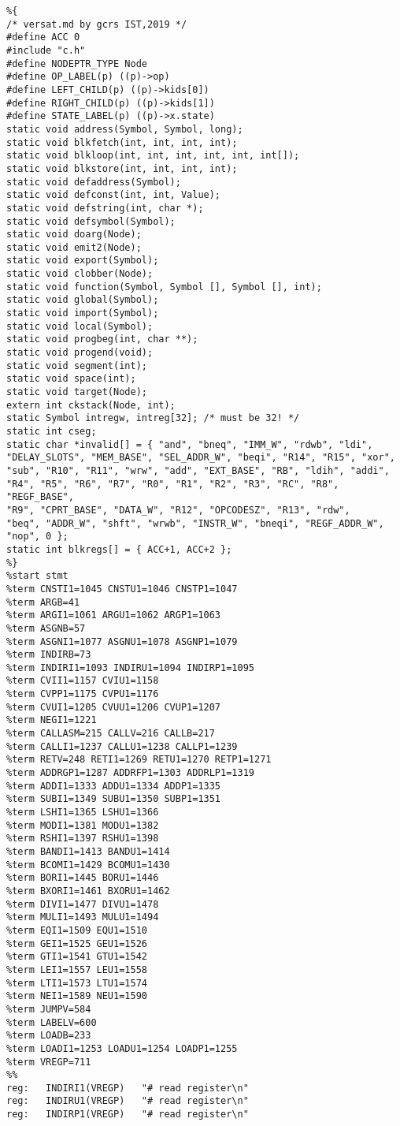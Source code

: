 {\footnotesize
\begin{verbatim}
%{
/* versat.md by gcrs IST,2019 */
#define ACC 0
#include "c.h"
#define NODEPTR_TYPE Node
#define OP_LABEL(p) ((p)->op)
#define LEFT_CHILD(p) ((p)->kids[0])
#define RIGHT_CHILD(p) ((p)->kids[1])
#define STATE_LABEL(p) ((p)->x.state)
static void address(Symbol, Symbol, long);
static void blkfetch(int, int, int, int);
static void blkloop(int, int, int, int, int, int[]);
static void blkstore(int, int, int, int);
static void defaddress(Symbol);
static void defconst(int, int, Value);
static void defstring(int, char *);
static void defsymbol(Symbol);
static void doarg(Node);
static void emit2(Node);
static void export(Symbol);
static void clobber(Node);
static void function(Symbol, Symbol [], Symbol [], int);
static void global(Symbol);
static void import(Symbol);
static void local(Symbol);
static void progbeg(int, char **);
static void progend(void);
static void segment(int);
static void space(int);
static void target(Node);
extern int ckstack(Node, int);
static Symbol intregw, intreg[32]; /* must be 32! */
static int cseg;
static char *invalid[] = { "and", "bneq", "IMM_W", "rdwb", "ldi",
"DELAY_SLOTS", "MEM_BASE", "SEL_ADDR_W", "beqi", "R14", "R15", "xor",
"sub", "R10", "R11", "wrw", "add", "EXT_BASE", "RB", "ldih", "addi",
"R4", "R5", "R6", "R7", "R0", "R1", "R2", "R3", "RC", "R8", "REGF_BASE",
"R9", "CPRT_BASE", "DATA_W", "R12", "OPCODESZ", "R13", "rdw",
"beq", "ADDR_W", "shft", "wrwb", "INSTR_W", "bneqi", "REGF_ADDR_W",
"nop", 0 };
static int blkregs[] = { ACC+1, ACC+2 };
%}
%start stmt
%term CNSTI1=1045 CNSTU1=1046 CNSTP1=1047
%term ARGB=41
%term ARGI1=1061 ARGU1=1062 ARGP1=1063
%term ASGNB=57
%term ASGNI1=1077 ASGNU1=1078 ASGNP1=1079
%term INDIRB=73
%term INDIRI1=1093 INDIRU1=1094 INDIRP1=1095
%term CVII1=1157 CVIU1=1158
%term CVPP1=1175 CVPU1=1176
%term CVUI1=1205 CVUU1=1206 CVUP1=1207
%term NEGI1=1221
%term CALLASM=215 CALLV=216 CALLB=217
%term CALLI1=1237 CALLU1=1238 CALLP1=1239
%term RETV=248 RETI1=1269 RETU1=1270 RETP1=1271
%term ADDRGP1=1287 ADDRFP1=1303 ADDRLP1=1319
%term ADDI1=1333 ADDU1=1334 ADDP1=1335
%term SUBI1=1349 SUBU1=1350 SUBP1=1351
%term LSHI1=1365 LSHU1=1366
%term MODI1=1381 MODU1=1382
%term RSHI1=1397 RSHU1=1398
%term BANDI1=1413 BANDU1=1414
%term BCOMI1=1429 BCOMU1=1430
%term BORI1=1445 BORU1=1446
%term BXORI1=1461 BXORU1=1462
%term DIVI1=1477 DIVU1=1478
%term MULI1=1493 MULU1=1494
%term EQI1=1509 EQU1=1510
%term GEI1=1525 GEU1=1526
%term GTI1=1541 GTU1=1542
%term LEI1=1557 LEU1=1558
%term LTI1=1573 LTU1=1574
%term NEI1=1589 NEU1=1590
%term JUMPV=584
%term LABELV=600
%term LOADB=233
%term LOADI1=1253 LOADU1=1254 LOADP1=1255
%term VREGP=711
%%
reg:   INDIRI1(VREGP)   "# read register\n"
reg:   INDIRU1(VREGP)   "# read register\n"
reg:   INDIRP1(VREGP)   "# read register\n"


\end{verbatim}}

